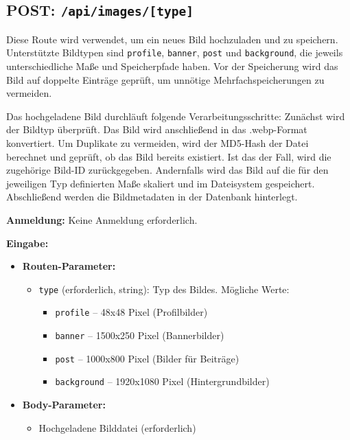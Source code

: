 \documentclass[a4paper,12pt]{article}
\begin{document}
\newpage
\subsection{POST: \texttt{/api/images/[type]}}

Diese Route wird verwendet, um ein neues Bild hochzuladen und zu speichern.
Unterstützte Bildtypen sind \texttt{profile}, \texttt{banner}, \texttt{post}
und \texttt{background}, die jeweils unterschiedliche Maße und Speicherpfade
haben. Vor der Speicherung wird das Bild auf doppelte Einträge geprüft, um
unnötige Mehrfachspeicherungen zu vermeiden.

Das hochgeladene Bild durchläuft folgende Verarbeitungsschritte: Zunächst wird
der Bildtyp überprüft. Das Bild wird anschließend in das .webp-Format
konvertiert. Um Duplikate zu vermeiden, wird der MD5-Hash der Datei berechnet
und geprüft, ob das Bild bereits existiert. Ist das der Fall, wird die
zugehörige Bild-ID zurückgegeben. Andernfalls wird das Bild auf die für den
jeweiligen Typ definierten Maße skaliert und im Dateisystem gespeichert.
Abschließend werden die Bildmetadaten in der Datenbank hinterlegt.

\textbf{Anmeldung:} Keine Anmeldung erforderlich.

\textbf{Eingabe:}
\begin{itemize}
    \item \textbf{Routen-Parameter:}
    \begin{itemize}
        \item \texttt{type} (erforderlich, string): Typ des Bildes. Mögliche Werte:
        \begin{itemize}
            \item \texttt{profile} – 48x48 Pixel (Profilbilder)
            \item \texttt{banner} – 1500x250 Pixel (Bannerbilder)
            \item \texttt{post} – 1000x800 Pixel (Bilder für Beiträge)
            \item \texttt{background} – 1920x1080 Pixel (Hintergrundbilder)
        \end{itemize}
    \end{itemize}
    \item \textbf{Body-Parameter:}
    \begin{itemize}
        \item Hochgeladene Bilddatei (erforderlich)
    \end{itemize}
\end{itemize}
\end{document}
